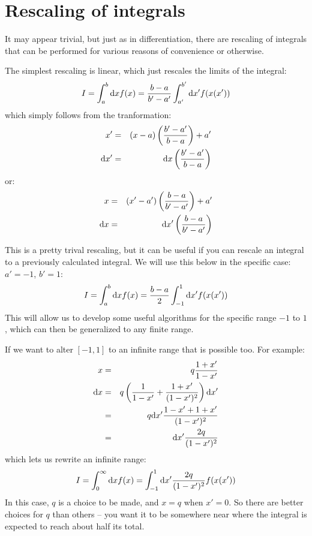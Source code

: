 \section{Rescaling of integrals}

It may appear trivial, but just as in differentiation, there are
rescaling of integrals that can be performed for various reasons of
convenience or otherwise. 

The simplest rescaling is linear, which just rescales the limits of
the integral:
\begin{equation}
 I = \int_a^b {\rm d}x f(x) = \frac{b-a}{b'-a'} \int_{a'}^{b'} {\rm d}x' f(x(x'))
\end{equation}
which simply follows from the tranformation:
\begin{eqnarray}
x' &=& (x-a) \left(\frac{b' - a'}{b-a}\right) + a' \cr
{\rm d}x' &=& {\rm d}x \left(\frac{b' - a'}{b-a}\right)
\end{eqnarray}
or:
\begin{eqnarray}
x &=& (x'-a') \left(\frac{b - a}{b'-a'}\right) + a' \cr
{\rm d}x &=& {\rm d}x' \left(\frac{b - a}{b'-a'}\right)
\end{eqnarray}

This is a pretty trival rescaling, but it can be useful if you can
rescale an integral to a previously calculated integral. We will use
this below in the specific case: $a'=-1$, $b'=1$:
\begin{equation}
 I = \int_a^b {\rm d}x f(x) = \frac{b-a}{2} \int_{-1}^{1} {\rm d}x' f(x(x'))
\end{equation}
This will allow us to develop some useful algorithms for the specific
range $-1$ to $1$, which can then be generalized to any finite range.

If we want to alter $[-1, 1]$ to an infinite range that is possible
too.  For example:
\begin{eqnarray}
x &=& q \frac{1+x'}{1-x'}  \cr
{\rm d}x &=& q \left(\frac{1}{1-x'} + \frac{1+x'}{(1-x')^2}\right){\rm
d}x'\cr
&=& q {\rm d}x' \frac{1 -x' + 1 + x'}{(1-x')^2}  \cr
&=& {\rm d}x' \frac{2q}{(1-x')^2}  \cr
\end{eqnarray}
which lets us rewrite an infinite range:
\begin{equation}
 I = \int_0^\infty {\rm d}x f(x) = \int_{-1}^{1} {\rm d}x'
 \frac{2q}{(1-x')^2} f(x(x'))
\end{equation}
In this case, $q$ is a choice to be made, and $x=q$ when $x'=0$. So
there are better choices for $q$ than others -- you want it to be
somewhere near where the integral is expected to reach about half its
total.

